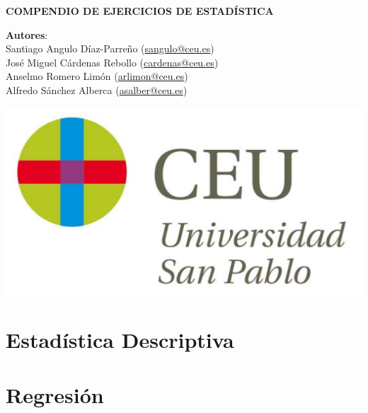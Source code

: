 \documentclass[a4paper,titlepage,dvips]{article}
\begin{document}
\sloppy

\begin{titlepage}
\vspace*{5cm}
\begin{center}
{\huge \bf COMPENDIO DE EJERCICIOS DE ESTADÍSTICA\par}
\vspace{0.5cm}
{\large \noindent \textbf{Autores}: \\
Santiago Angulo Díaz-Parreño (\url{sangulo@ceu.es})\\
José Miguel Cárdenas Rebollo (\url{cardenas@ceu.es})\\
Anselmo Romero Limón (\url{arlimon@ceu.es})\\
Alfredo Sánchez Alberca (\url{asalber@ceu.es})
}

\vspace{1cm}
 \includegraphics[scale=0.3]{img/logo_uspceu_01}
\end{center}
\end{titlepage}

\setcounter{tocdepth}{2}
\tableofcontents
\newpage

\section{Estadística Descriptiva}
\begin{enumerate}[leftmargin=*]
\end{enumerate}

\section{Regresión}
\begin{enumerate}[leftmargin=*]
\end{enumerate}
\end{document}
